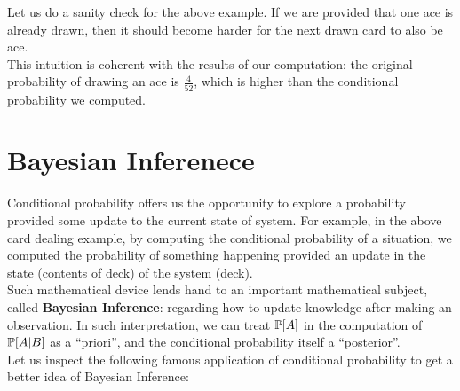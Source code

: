 Let us do a sanity check for the above example. If we are provided that one ace is already drawn, then it should become harder for the next drawn card to also be ace. \\
This intuition is coherent with the results of our computation: the original probability of drawing an ace is $\frac{4}{52}$, which is higher than the conditional probability we computed.

\section{Bayesian Inferenece}
Conditional probability offers us the opportunity to explore a probability provided some update to the current state of system. For example, in the above card dealing example, by computing the conditional probability of a situation, we computed the probability of something happening provided an update in the state (contents of deck) of the system (deck). \\
Such mathematical device lends hand to an important mathematical subject, called \textbf{Bayesian Inference}: regarding how to update knowledge after making an observation. In such interpretation, we can treat $\P[A]$ in the computation of $\P[A|B]$ as a ``priori'', and the conditional probability itself a ``posterior''. \\
Let us inspect the following famous application of conditional probability to get a better idea of Bayesian Inference:
